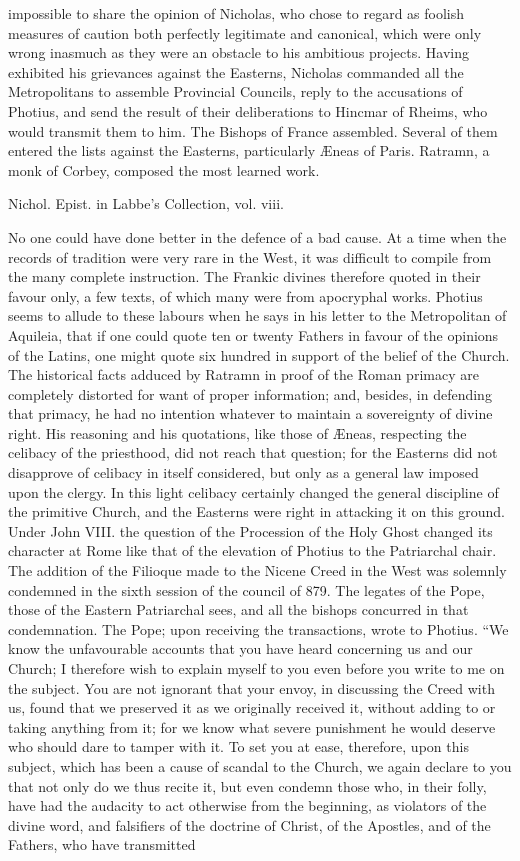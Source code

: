 impossible to share the opinion of Nicholas, who chose to regard as foolish measures of caution both perfectly legitimate and canonical, which were only wrong inasmuch as they were an obstacle to his ambitious projects. Having exhibited his grievances against the Easterns, Nicholas commanded all the Metropolitans to assemble Provincial Councils, reply to the accusations of Photius, and send the result of their deliberations to Hincmar of Rheims, who would transmit them to him. The Bishops of France assembled. Several of them entered the lists against the Easterns, particularly Æneas of Paris. Ratramn, a monk of Corbey, composed the most learned work.

Nichol. Epist. in Labbe’s Collection, vol. viii.

No one could have done better in the defence of a bad cause. At a time when the records of tradition were very rare in the West, it was difficult to compile from the many complete instruction. The Frankic divines therefore quoted in their favour only, a few texts, of which many were from apocryphal works. Photius seems to allude to these labours when he says in his letter to the Metropolitan of Aquileia, that if one could quote ten or twenty Fathers in favour of the opinions of the Latins, one might quote six hundred in support of the belief of the Church. The historical facts adduced by Ratramn in proof of the Roman primacy are completely distorted for want of proper information; and, besides, in defending that primacy, he had no intention whatever to maintain a sovereignty of divine right. His reasoning and his quotations, like those of Æneas, respecting the celibacy of the priesthood, did not reach that question; for the Easterns did not disapprove of celibacy in itself considered, but only as a general law imposed upon the clergy. In this light celibacy certainly changed the general discipline of the primitive Church, and the Easterns were right in attacking it on this ground. Under John VIII. the question of the Procession of the Holy Ghost changed its character at Rome like that of the elevation of Photius to the Patriarchal chair. The addition of the Filioque made to the Nicene Creed in the West was solemnly condemned in the sixth session of the council of 879. The legates of the Pope, those of the Eastern Patriarchal sees, and all the bishops concurred in that condemnation. The Pope; upon receiving the transactions, wrote to Photius. “We know the unfavourable accounts that you have heard concerning us and our Church; I therefore wish to explain myself to you even before you write to me on the subject. You are not ignorant that your envoy, in discussing the Creed with us, found that we preserved it as we originally received it, without adding to or taking anything from it; for we know what severe punishment he would deserve who should dare to tamper with it. To set you at ease, therefore, upon this subject, which has been a cause of scandal to the Church, we again declare to you that not only do we thus recite it, but even condemn those who, in their folly, have had the audacity to act otherwise from the beginning, as violators of the divine word, and falsifiers of the doctrine of Christ, of the Apostles, and of the Fathers, who have transmitted 